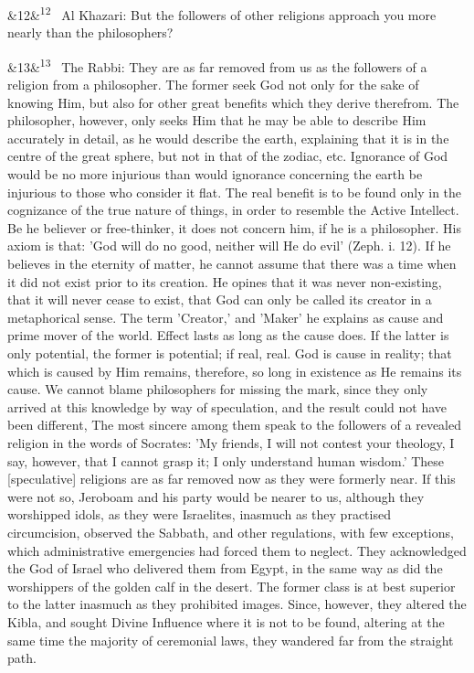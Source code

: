 \documentclass[12pt]{article}
\newcommand{\para}[1][]{\par\noindent\ifx&#1&\else\textsuperscript{\footnotesize #1}~\fi}
\begin{document}
\para[12] Al Khazari: But the followers of other religions approach you more nearly than the philosophers?

\para[13] The Rabbi: They are as far removed from us as the followers of a religion from a philosopher. The former seek God not only for the sake of knowing Him, but also for other great benefits which they derive therefrom. The philosopher, however, only seeks Him that he may be able to describe Him accurately in detail, as he would describe the earth, explaining that it is in the centre of the great sphere, but not in that of the zodiac, etc. Ignorance of God would be no more injurious than would ignorance concerning the earth be injurious to those who consider it flat. The real benefit is to be found only in the cognizance of the true nature of things, in order to resemble the Active Intellect. Be he believer or free-thinker, it does not concern him, if he is a philosopher. His axiom is that: 'God will do no good, neither will He do evil' (Zeph. i. 12). If he believes in the eternity of matter, he cannot assume that there was a time when it did not exist prior to its creation. He opines that it was never non-existing, that it will never cease to exist, that God can only be called its creator in a metaphorical sense. The term 'Creator,' and 'Maker' he explains as cause and prime mover of the world. Effect lasts as long as the cause does. If the latter is only potential, the former is potential; if real, real. God is cause in reality; that which is caused by Him remains, therefore, so long in existence as He remains its cause. We cannot blame philosophers for missing the mark, since they only arrived at this knowledge by way of speculation, and the result could not have been different, The most sincere among them speak to the followers of a revealed religion in the words of Socrates: 'My friends, I will not contest your theology, I say, however, that I cannot grasp it; I only understand human wisdom.' These [speculative] religions are as far removed now as they were formerly near. If this were not so, Jeroboam and his party would be nearer to us, although they worshipped idols, as they were Israelites, inasmuch as they practised circumcision, observed the Sabbath, and other regulations, with few exceptions, which administrative emergencies had forced them to neglect. They acknowledged the God of Israel who delivered them from Egypt, in the same way as did the worshippers of the golden calf in the desert. The former class is at best superior to the latter inasmuch as they prohibited images. Since, however, they altered the Kibla, and sought Divine Influence where it is not to be found, altering at the same time the majority of ceremonial laws, they wandered far from the straight path.
\end{document}
